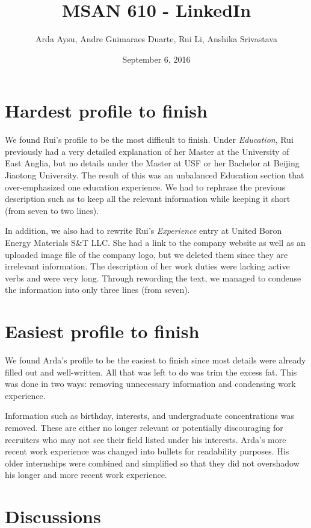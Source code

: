 \documentclass[]{article}
\title{MSAN 610 - LinkedIn}
\author{Arda Aysu, Andre Guimaraes Duarte, Rui Li, Anshika Srivastava}
\date{September 6, 2016}
\begin{document}
\maketitle

\section*{Hardest profile to finish}
We found Rui's profile to be the most difficult to finish. Under \textit{Education}, Rui previously had a very detailed explanation of her Master at the University of East Anglia, but no details under the Master at USF or her Bachelor at Beijing Jiaotong University. The result of this was an unbalanced Education section that over-emphasized one education experience. We had to rephrase the previous description such as to keep all the relevant information while keeping it short (from seven to two lines).

In addition, we also had to rewrite Rui's \textit{Experience} entry at United Boron Energy Materials S\&T LLC. She had a link to the company website as well as an uploaded image file of the company logo, but we deleted them since they are irrelevant information. The description of her work duties were lacking active verbs and were very long. Through rewording the text, we managed to condense the information into only three lines (from seven).

\section*{Easiest profile to finish}
We found Arda's profile to be the easiest to finish since most details were already filled out and well-written. All that was left to do was trim the excess fat. This was done in two ways: removing unnecessary information and condensing work experience.

Information such as birthday, interests, and undergraduate concentrations was removed. These are either no longer relevant or potentially discouraging for recruiters who may not see their field listed under his interests. Arda's more recent work experience was changed into bullets for readability purposes. His older internships were combined and simplified so that they did not overshadow his longer and more recent work experience.

\section*{Discussions}
\end{document}
